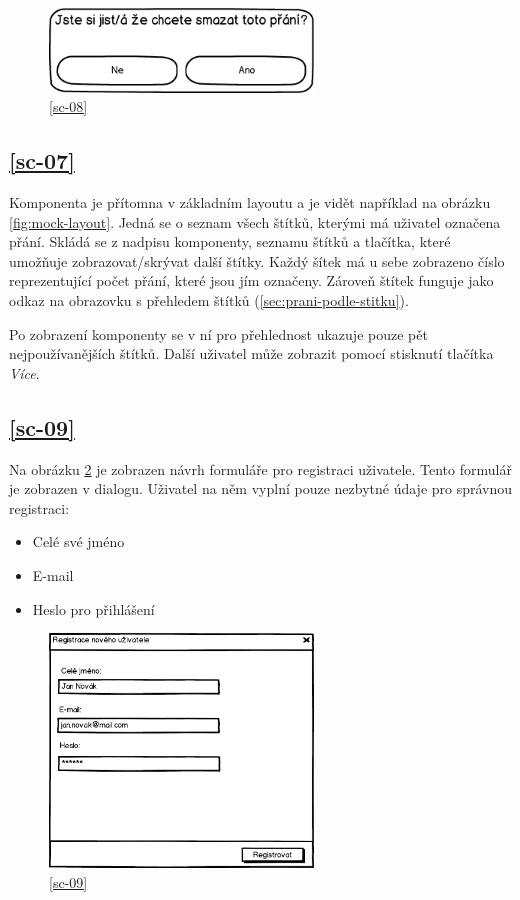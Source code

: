 \begin{figure}[htb]
\begin{center}
\includegraphics[width=70mm]{./pictures/mock/dialog-mazani-prani.png}
\caption{\ref{sc-08}}
\label{fig:dialog-mazani-prani}
\end{center}
\end{figure}

\subsection{\ref{sc-07}}
Komponenta je přítomna v základním layoutu a je vidět například na obrázku \ref{fig:mock-layout}. Jedná se o seznam všech štítků, kterými má uživatel označena přání. Skládá se z nadpisu komponenty, seznamu štítků a tlačítka, které umožňuje zobrazovat/skrývat další štítky. Každý šítek má u sebe zobrazeno číslo reprezentující počet přání, které jsou jím označeny. Zároveň štítek funguje jako odkaz na obrazovku s přehledem štítků (\ref{sec:prani-podle-stitku}).

Po zobrazení komponenty se v ní pro přehlednost ukazuje pouze pět nejpoužívanějších štítků. Další uživatel může zobrazit pomocí stisknutí tlačítka \emph{Více}.

\subsection{\ref{sc-09}}
Na obrázku \ref{fig:dialog-registrace} je zobrazen návrh formuláře pro registraci uživatele. Tento formulář je zobrazen v dialogu. Uživatel na něm vyplní pouze nezbytné údaje pro správnou registraci:
\begin{itemize}
\item Celé své jméno
\item E-mail
\item Heslo pro přihlášení
\end{itemize} 

\begin{figure}[htb]
\begin{center}
\includegraphics[width=70mm]{./pictures/mock/dialog-registrace.png}
\caption{\ref{sc-09}}
\label{fig:dialog-registrace}
\end{center}
\end{figure}

